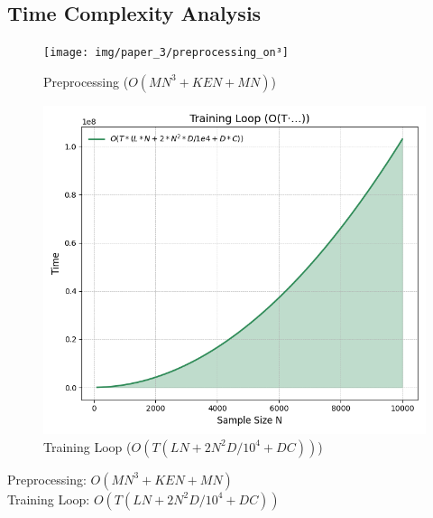 \subsection{Time Complexity Analysis}

\begin{figure}[H]
	\centering
	\begin{minipage}[b]{0.40\linewidth}
		\centering
		\texttt{[image: img/paper\_3/preprocessing\_on³]}
		\caption{Preprocessing (\(O(MN^3 + KEN + MN)\))}
		\label{fig:preprocessingon3}
	\end{minipage}
	\hfill
	\begin{minipage}[b]{0.40\linewidth}
		\centering
		\includegraphics[width=\linewidth]{img/paper_3/training_loop_ot·…}
		\caption{Training Loop (\(O(T(LN + 2N^2D/10^4 + DC))\))}
		\label{fig:trainingloopot}
	\end{minipage}
\end{figure}

\noindent Preprocessing: \(O(MN^3 + KEN + MN)\) \\
Training Loop: \(O(T(LN + 2N^2D/10^4 + DC))\)

